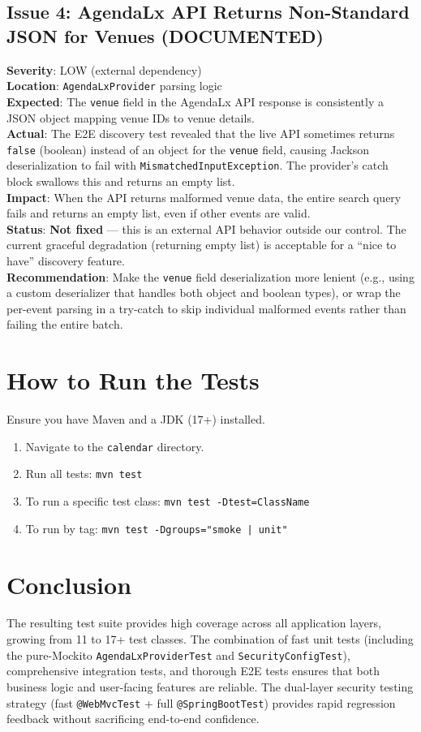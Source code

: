 \documentclass[11pt]{article}
\begin{document}
  \subsection{Issue 4: AgendaLx API Returns Non-Standard JSON for Venues (DOCUMENTED)}
  \textbf{Severity}: LOW (external dependency) \\
  \textbf{Location}: \texttt{AgendaLxProvider} parsing logic \\
  \textbf{Expected}: The \texttt{venue} field in the AgendaLx API response is consistently a JSON object mapping venue IDs to venue details. \\
  \textbf{Actual}: The E2E discovery test revealed that the live API sometimes returns \texttt{false} (boolean) instead of an object for the \texttt{venue} field, causing Jackson deserialization to fail with \texttt{MismatchedInputException}. The provider's catch block swallows this and returns an empty list. \\
  \textbf{Impact}: When the API returns malformed venue data, the entire search query fails and returns an empty list, even if other events are valid. \\
  \textbf{Status}: \textbf{Not fixed} --- this is an external API behavior outside our control. The current graceful degradation (returning empty list) is acceptable for a ``nice to have'' discovery feature. \\
  \textbf{Recommendation}: Make the \texttt{venue} field deserialization more lenient (e.g., using a custom deserializer that handles both object and boolean types), or wrap the per-event parsing in a try-catch to skip individual malformed events rather than failing the entire batch.

  \section{How to Run the Tests}
  Ensure you have Maven and a JDK (17+) installed.
  \begin{enumerate}
    \item Navigate to the \texttt{calendar} directory.
    \item Run all tests: \texttt{mvn test}
    \item To run a specific test class: \texttt{mvn test -Dtest=ClassName}
    \item To run by tag: \texttt{mvn test -Dgroups="smoke | unit"}
  \end{enumerate}

  \section{Conclusion}
  The resulting test suite provides high coverage across all application layers, growing from 11 to 17+ test classes. The combination of fast unit tests (including the pure-Mockito \texttt{AgendaLxProviderTest} and \texttt{SecurityConfigTest}), comprehensive integration tests, and thorough E2E tests ensures that both business logic and user-facing features are reliable. The dual-layer security testing strategy (fast \texttt{@WebMvcTest} + full \texttt{@SpringBootTest}) provides rapid regression feedback without sacrificing end-to-end confidence.
\end{document}
